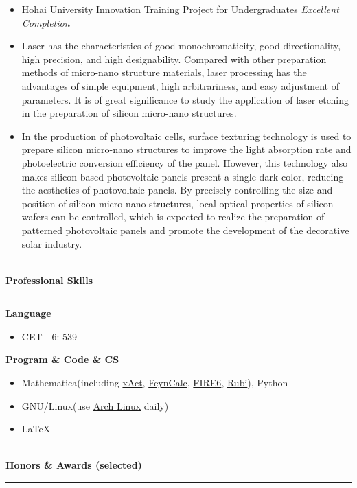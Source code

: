 \documentclass[12pt]{article}
\newcommand{\sect}[1]{
    ~\\ \noindent \textbf{#1} \medskip \hrule \medskip
}
\begin{document}
\begin{itemize}[noitemsep,nolistsep]
    \item Hohai University Innovation Training Project for Undergraduates \textit{Excellent Completion}
    \item Laser has the characteristics of good monochromaticity, good directionality, high precision, and high designability. Compared with other preparation methods of micro-nano structure materials, laser processing has the advantages of simple equipment, high arbitrariness, and easy adjustment of parameters. It is of great significance to study the application of laser etching in the preparation of silicon micro-nano structures.
    \item In the production of photovoltaic cells, surface texturing technology is used to prepare silicon micro-nano structures to improve the light absorption rate and photoelectric conversion efficiency of the panel. However, this technology also makes silicon-based photovoltaic panels present a single dark color, reducing the aesthetics of photovoltaic panels. By precisely controlling the size and position of silicon micro-nano structures, local optical properties of silicon wafers can be controlled, which is expected to realize the preparation of patterned photovoltaic panels and promote the development of the decorative solar industry.
\end{itemize}


\sect{Professional Skills}

\textbf{Language}
\begin{itemize}[noitemsep,nolistsep]
    \item CET - 6: 539
\end{itemize}

\textbf{Program \& Code \& CS}
\begin{itemize}[noitemsep,nolistsep]
    \item Mathematica(including \href{http://xact.es/index.html}{xAct}, \href{https://feyncalc.github.io/}{FeynCalc}, \href{https://arxiv.org/abs/1901.07808}{FIRE6}, \href{https://rulebasedintegration.org/}{Rubi}), Python
    \item GNU/Linux(use \href{https://archlinux.org/}{Arch Linux} daily)
    \item \LaTeX
\end{itemize}


\sect{Honors \& Awards (selected)}
\end{document}
